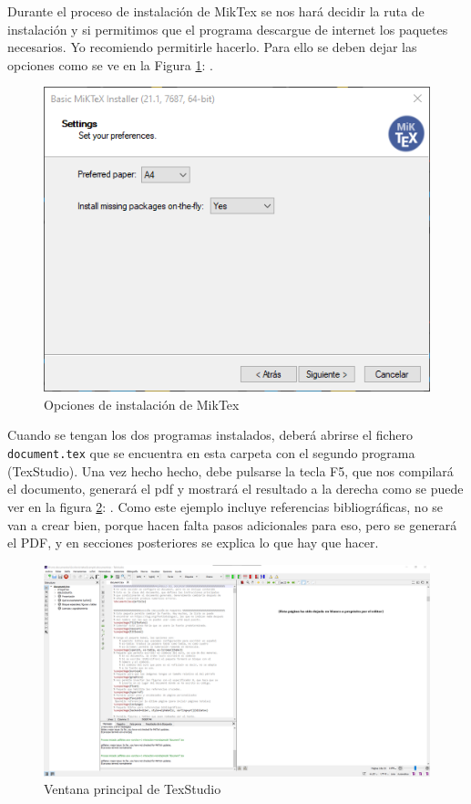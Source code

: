 \documentclass[a4paper]{article}
\begin{document}
Durante el proceso de
instalación de MikTex se nos hará decidir la ruta de instalación y si permitimos
que el programa descargue de internet los paquetes necesarios. Yo
recomiendo permitirle hacerlo. Para ello se deben dejar las opciones como
se ve en la Figura \ref{fig:miktex}: .
\begin{figure}[H]
    \center
    \includegraphics[width=0.75\hsize]{miktexInstall}
    \caption{Opciones de instalación de MikTex}
    \label{fig:miktex}
\end{figure}

Cuando se tengan los dos programas instalados, deberá abrirse el fichero
\texttt{document.tex} que se encuentra en esta carpeta
con el segundo programa (TexStudio). Una vez hecho hecho, debe pulsarse la tecla
F5, que nos compilará el documento, generará el pdf y mostrará el resultado a la
derecha como se puede ver en la figura \ref{fig:texstudio}:
. Como este ejemplo incluye referencias bibliográficas,
no se van a crear bien, porque hacen falta pasos adicionales para eso, pero
se generará el PDF, y en secciones posteriores se explica lo que hay que hacer.

\begin{figure}[H]
    \center
    \includegraphics[width=1.0\hsize]{TexStudio}
    \caption{Ventana principal de TexStudio}
    \label{fig:texstudio}
\end{figure}
\end{document}
